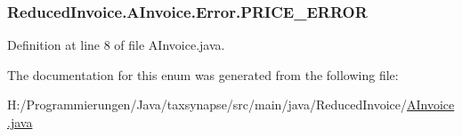 \hypertarget{enum_reduced_invoice_1_1_a_invoice_1_1_error_a5c521b3b1cc9827b5dba56d42a770481}{
\subsubsection[{P\-R\-I\-C\-E\-\_\-\-E\-R\-R\-O\-R}]{\setlength{\rightskip}{0pt plus 5cm}Reduced\-Invoice.\-A\-Invoice.\-Error.\-P\-R\-I\-C\-E\-\_\-\-E\-R\-R\-O\-R}}\label{enum_reduced_invoice_1_1_a_invoice_1_1_error_a5c521b3b1cc9827b5dba56d42a770481}


Definition at line 8 of file A\-Invoice.\-java.



The documentation for this enum was generated from the following file\-:\begin{DoxyCompactItemize}
\item 
H\-:/\-Programmierungen/\-Java/taxsynapse/src/main/java/\-Reduced\-Invoice/\hyperlink{_a_invoice_8java}{A\-Invoice.\-java}\end{DoxyCompactItemize}
